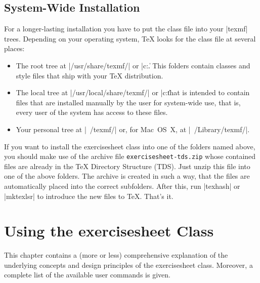 \documentclass[a4paper,fleqn]{report}
\def\exercisesheet{{exercisesheet}}
\begin{document}
\section{System-Wide Installation}

For a longer-lasting installation you have to put the class file into
your |texmf| trees. Depending on your operating system, \TeX{} looks
for the class file at several places:
\begin{itemize}
  \item The root tree at |/usr/share/texmf/| or |c:\texmf\|. This
    folders contain classes and style files that ship with your \TeX{}
    distribution.
  \item The local tree at |/usr/local/share/texmf/| or
    |c:\localtexmf\| that is intended to contain files that are
    installed manually by the user for system-wide use, that is, every
    user of the system has access to these files.
  \item Your personal tree at |~/texmf/| or, for Mac~OS~X, at
    |~/Library/texmf/|.
\end{itemize}
If you want to install the \exercisesheet{} class into one of the
folders named above, you should make use of the archive file
\lstinline[language=bash]{exercisesheet-tds.zip} whose contained
files are already in the \TeX{} Directory Structure (TDS). Just unzip
this file into one of the above folders. The archive is created in
such a way, that the files are automatically placed into the correct
subfolders. After this, run |texhash| or |mktexlsr| to introduce the
new files to \TeX. That's it.


\chapter{Using the \exercisesheet{} Class}

This chapter contains a (more or less) comprehensive explanation of
the underlying concepts and design principles of the \exercisesheet{}
class. Moreover, a complete list of the available user commands is
given.


% 
\end{document}
